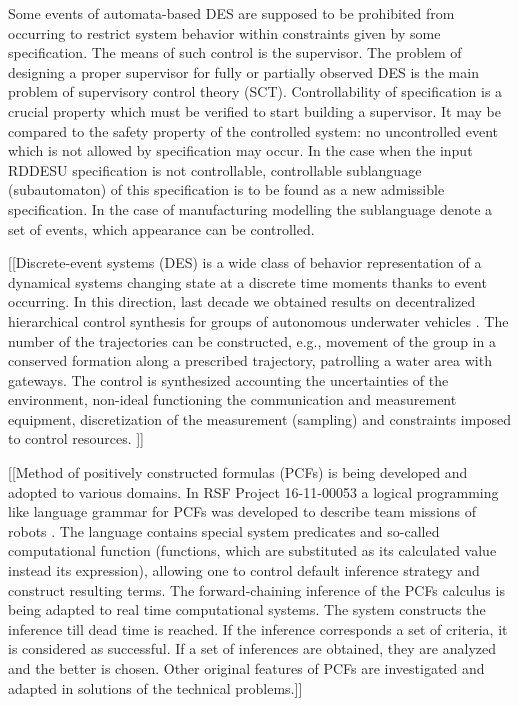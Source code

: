 \documentclass[runningheads]{llncs}
\begin{document}
Some events of automata-based DES are supposed to be prohibited from occurring to restrict system behavior within constraints given by some specification. The means of such control is the supervisor. The problem of designing a proper supervisor for fully or partially observed DES is the main problem of supervisory control theory (SCT). Controllability of specification is a crucial property which must be verified to start building a supervisor. It may be compared to the safety property of the controlled system: no uncontrolled event which is not allowed by specification may occur. In the case when the input RDDESU specification is not controllable, controllable sublanguage (subautomaton) of this specification is to be found as a new admissible specification. In the case of manufacturing modelling the sublanguage denote a set of events, which appearance can be controlled. %

[[Discrete-event systems (DES) is a wide class of behavior representation of a dynamical systems changing state at a discrete time moments thanks to event occurring. In this direction, last decade we obtained results on decentralized hierarchical control synthesis for groups of autonomous underwater vehicles \cite{b4}. The number of the trajectories can be constructed, e.g., movement of the group in a conserved formation along a prescribed trajectory, patrolling a water area with gateways. The control is synthesized accounting the uncertainties of the environment, non-ideal functioning the communication and measurement equipment, discretization of the measurement (sampling) and constraints imposed to control resources. ]]

[[Method of positively constructed formulas (PCFs) is being developed and adopted to various domains. In RSF Project 16-11-00053 a logical programming like language grammar for PCFs was developed to describe team missions of robots \cite{b5}. The language contains special system predicates and so-called computational function (functions, which are substituted as its calculated value instead its expression), allowing one to control default inference strategy and construct resulting terms. The forward-chaining inference of the PCFs calculus is being adapted to real time computational systems. The system constructs the inference till dead time is reached. If the inference corresponds a set of criteria, it is considered as successful. If a set of inferences are obtained, they are analyzed and the better is chosen. Other original features of PCFs are investigated and adapted in solutions of the technical problems.]]
\end{document}
